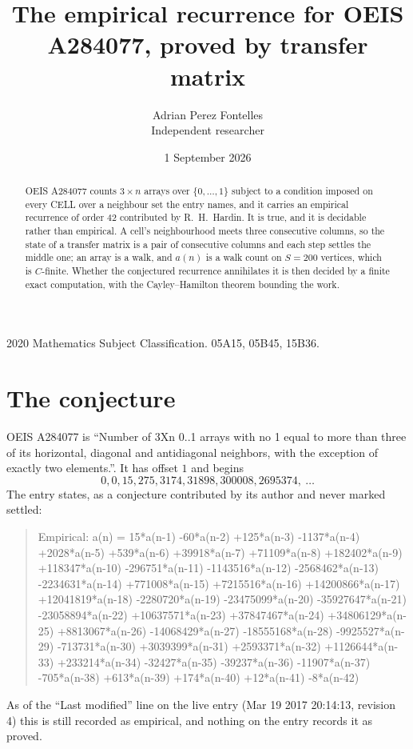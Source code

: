 \documentclass[11pt,a4paper]{article}
\title{The empirical recurrence for OEIS A284077, proved by transfer matrix}
\author{Adrian Perez Fontelles\\ \small Independent researcher}
\date{1 September 2026}
\theoremstyle{plain}
\theoremstyle{definition}
\begin{document}
\maketitle

\begin{abstract}
OEIS A284077 counts $3\times n$ arrays over $\{0,\dots,1\}$ subject to a condition imposed on
every CELL over a neighbour set the entry names, and it carries an empirical recurrence of
order $42$ contributed by R.~H.~Hardin. It is true, and it is decidable rather than
empirical. A cell's neighbourhood meets three consecutive columns, so the state of a transfer
matrix is a pair of consecutive columns and each step settles the middle one; an array is a
walk, and $a(n)$ is a walk count on $S=200$ vertices, which is $C$-finite. Whether the
conjectured recurrence annihilates it is then decided by a finite exact computation, with the
Cayley--Hamilton theorem bounding the work.
\end{abstract}

\noindent\small 2020 Mathematics Subject Classification. 05A15, 05B45, 15B36.\normalsize

\section{The conjecture}

OEIS A284077 is ``Number of 3Xn 0..1 arrays with no 1 equal to more than three of its horizontal, diagonal and antidiagonal neighbors, with the exception of exactly two elements.''. It has offset $1$ and begins
\[
0, 0, 15, 275, 3174, 31898, 300008, 2695374,\ \dots
\]
The entry states, as a conjecture contributed by its author and never marked settled:
\begin{quote}
Empirical: a(n) = 15*a(n-1) -60*a(n-2) +125*a(n-3) -1137*a(n-4) +2028*a(n-5) +539*a(n-6) +39918*a(n-7) +71109*a(n-8) +182402*a(n-9) +118347*a(n-10) -296751*a(n-11) -1143516*a(n-12) -2568462*a(n-13) -2234631*a(n-14) +771008*a(n-15) +7215516*a(n-16) +14200866*a(n-17) +12041819*a(n-18) -2280720*a(n-19) -23475099*a(n-20) -35927647*a(n-21) -23058894*a(n-22) +10637571*a(n-23) +37847467*a(n-24) +34806129*a(n-25) +8813067*a(n-26) -14068429*a(n-27) -18555168*a(n-28) -9925527*a(n-29) -713731*a(n-30) +3039399*a(n-31) +2593371*a(n-32) +1126644*a(n-33) +233214*a(n-34) -32427*a(n-35) -39237*a(n-36) -11907*a(n-37) -705*a(n-38) +613*a(n-39) +174*a(n-40) +12*a(n-41) -8*a(n-42)
\end{quote}
As of the ``Last modified'' line on the live entry (Mar 19 2017 20:14:13, revision 4) this is still
recorded as empirical, and nothing on the entry records it as proved.
\end{document}

